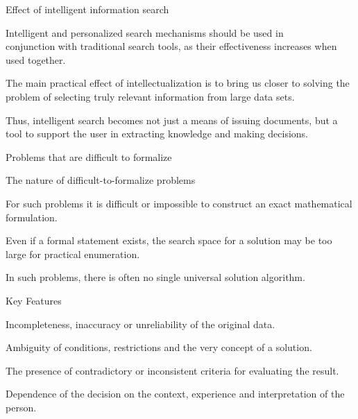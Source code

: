 \begin{frame}{Effect of intelligent information search}
	\topline
	\justifying
	
	\begin{textitemize}
		\item Intelligent and personalized search mechanisms should be used in\\ conjunction with traditional search tools, as their effectiveness increases when used together.
		\item The main practical effect of intellectualization is to bring us closer to solving the problem of selecting truly relevant information from large data sets.
		\item Thus, intelligent search becomes not just a means of issuing documents, but a tool to support the user in extracting knowledge and making decisions.
	\end{textitemize}
\end{frame}

\begin{frame}{Problems that are difficult to formalize}
	\topline
	\justifying
	
	\begin{SCn}
	\end{SCn}
\end{frame}

\begin{frame}{The nature of difficult-to-formalize problems}
	\topline
	\justifying
	
	\begin{textitemize}
		\item For such problems it is difficult or impossible to construct an exact mathematical formulation.
		\item Even if a formal statement exists, the search space for a solution may be too large for practical enumeration.
		\item In such problems, there is often no single universal solution algorithm.
	\end{textitemize}
\end{frame}

\begin{frame}{Key Features}
	\topline
	\justifying
	
	\begin{textitemize}
		\item Incompleteness, inaccuracy or unreliability of the original data.
		\item Ambiguity of conditions, restrictions and the very concept of a solution.
		\item The presence of contradictory or inconsistent criteria for evaluating the result.
		\item Dependence of the decision on the context, experience and interpretation of the person.
	\end{textitemize}
\end{frame}

